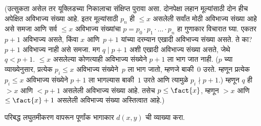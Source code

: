 \documentclass[../../../include/open-logic-section]{subfiles}
\begin{document}
(उत्सुकता असेल तर यूक्लिडच्या निकालाचा संक्षिप्त पुरावा असा. दोनपेक्षा
लहान मूल्यांसाठी दोन हीच अपेक्षित अविभाज्य संख्या आहे. इतर मूल्यांसाठी
$p_n$ ही $\le x$ असलेली सर्वांत मोठी अविभाज्य संख्या आहे असे समजा आणि
सर्व $\le x$ अविभाज्य संख्यांचा $p =
p_0\cdot p_1 \cdot \dots \cdot p_n$ हा गुणाकार विचारात घ्या. एकतर $p+1$
अविभाज्य असते, किंवा $x$ आणि~$p+1$ यांच्या दरम्यान एखादी अविभाज्य संख्या
असते. ते का? $p+1$ अविभाज्य नाही असे समजा. मग $q \mid p+1$ अशी एखादी
अविभाज्य संख्या असते, जेथे $q < p+1$. $\le x$ असलेल्या कोणत्याही अविभाज्य
संख्येने $p+1$ ला भाग जात नाही. ($p$ च्या व्याख्येनुसार, प्रत्येक
$p_i \le x$ अविभाज्य संख्येने~$p$ ला भाग जातो, म्हणजे बाकी~$0$ उरते.
म्हणून प्रत्येक $p_i \le x$ अविभाज्य संख्येने $p+1$ ला भागल्यास बाकी~$1$
उरते आणि त्यामुळे $p_i \nmid p+1$.) म्हणून $q$ ही $> x$ आणि $< p+1$
असलेली अविभाज्य संख्या आहे. तसेच $p \le \fact{x}$, म्हणून $> x$ आणि $\le
\fact{x}+1$ असलेली अविभाज्य संख्या अस्तित्वात आहे.)

\begin{prob}
परिबद्ध लघुतमीकरण वापरून पूर्णांक भागाकार $d(x, y)$ ची व्याख्या करा.
\end{prob}
\end{document}
